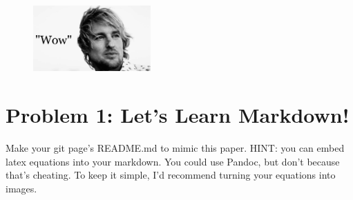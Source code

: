 \documentclass{article}
\begin{document}
\begin{figure} [h]
\centering
\includegraphics[width=0.4\textwidth]{wow.jpg}
\end{figure}

\section*{Problem 1: Let's Learn Markdown!}
Make your git page’s README.md to mimic this paper. HINT: you can embed latex equations into your markdown. You could use Pandoc, but don’t because that’s cheating. To keep it simple, I’d recommend turning your equations into images.
\end{document}
